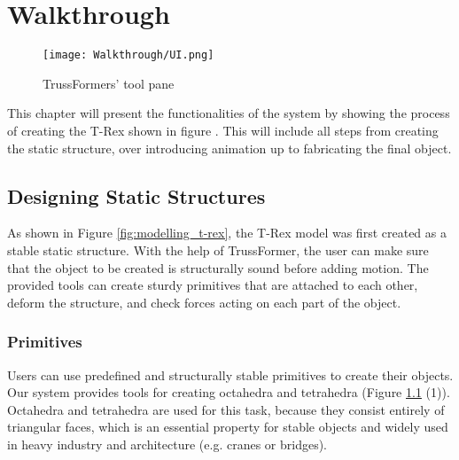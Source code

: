 \chapter{Walkthrough}\label{ch:walkthrough}
\begin{figure}[h!]
    \texttt{[image: Walkthrough/UI.png]}
    \centering
    \caption{TrussFormers' tool pane}
    \label{fig:tool_pane}
\end{figure}
This chapter will present the functionalities of the system by showing the process of creating the T-Rex shown in figure . This will include all steps from creating the static structure, over introducing animation up to fabricating the final object.

\section{Designing Static Structures}
As shown in Figure \ref{fig:modelling_t-rex}, the T-Rex model was first created as a stable static structure. With the help of TrussFormer, the user can make sure that the object to be created is structurally sound before adding motion. The provided tools can create sturdy primitives that are attached to each other, deform the structure, and check forces acting on each part of the object.

\subsection{Primitives}
Users can use predefined and structurally stable primitives to create their objects. Our system provides tools for creating octahedra and tetrahedra (Figure \ref{fig:tool_pane} (1)). Octahedra and tetrahedra are used for this task, because they consist entirely of triangular faces, which is an essential property for stable objects and widely used in heavy industry and architecture (e.g. cranes or bridges).

